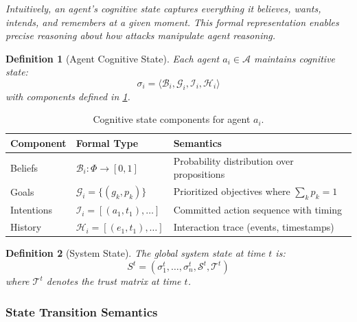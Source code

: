 \documentclass[
]{article}
\newtheorem{definition}{Definition}[section]
\begin{document}
\emph{Intuitively, an agent's cognitive state captures everything it
believes, wants, intends, and remembers at a given moment. This formal
representation enables precise reasoning about how attacks manipulate
agent reasoning.}

\begin{definition}[Agent Cognitive State]
\label{def:cognitive-state}
Each agent $a_i \in \mathcal{A}$ maintains cognitive state:
\begin{equation}
\label{eq:cognitive-state}
\sigma_i = \langle \mathcal{B}_i, \mathcal{G}_i, \mathcal{I}_i, \mathcal{H}_i \rangle
\end{equation}
with components defined in \cref{tab:cognitive-components}.
\end{definition}

\begin{table}[htbp]
\centering
\caption{Cognitive state components for agent $a_i$.}
\label{tab:cognitive-components}
\begin{tabular}{@{}llp{5.5cm}@{}}
\toprule
Component & Formal Type & Semantics \\
\midrule
Beliefs & $\mathcal{B}_i: \Phi \to [0,1]$ & Probability distribution over propositions \\
Goals & $\mathcal{G}_i = \{(g_k, p_k)\}$ & Prioritized objectives where $\sum_k p_k = 1$ \\
Intentions & $\mathcal{I}_i = [(a_1, t_1), \ldots]$ & Committed action sequence with timing \\
History & $\mathcal{H}_i = [(e_1, t_1), \ldots]$ & Interaction trace (events, timestamps) \\
\bottomrule
\end{tabular}
\end{table}

\begin{definition}[System State]
\label{def:system-state}
The global system state at time $t$ is:
\begin{equation}
\label{eq:system-state}
S^t = (\sigma_1^t, \ldots, \sigma_n^t, \mathcal{S}^t, \mathcal{T}^t)
\end{equation}
where $\mathcal{T}^t$ denotes the trust matrix at time $t$.
\end{definition}

\subsubsection{State Transition
Semantics}\label{state-transition-semantics}
\end{document}
